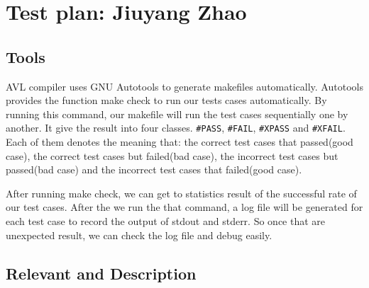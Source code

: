 \section{Test plan: Jiuyang Zhao}

\subsection{Tools}

AVL compiler uses GNU Autotools to generate makefiles automatically. Autotools provides the function
make check to run our tests cases automatically. By running this command, our makefile will run the
test cases sequentially one by another. It give the result into four classes. \verb"#PASS",
\verb"#FAIL", \verb"#XPASS" and \verb"#XFAIL". Each of them denotes the meaning that: the correct
test cases that passed(good case), the correct test cases but failed(bad case), the incorrect test
cases but passed(bad case) and the incorrect test cases that failed(good case).

After running  make check, we can get to statistics result of the successful rate of our test cases.
After the we run the that command, a log file will be generated for each test case to record the
output of stdout and stderr. So once that are unexpected result, we can check the log file and debug
easily.

\subsection{Relevant and Description}

